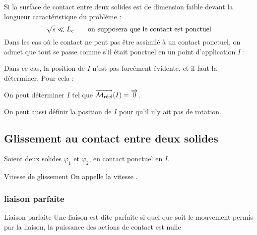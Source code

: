 \documentclass[a4paper,french,bookmarks]{book}
\begin{document}
    Si la surface de contact entre deux solides est de dimension faible devant la longueur caractéristique du problème :
    \[ \sqrt{s} \ll L_\text c \qquad\text{on supposera que le contact est ponctuel}\]
    Dans les cas où le contact ne peut pas être assimilé à un contact ponctuel, on admet que tout se passe comme s'il était ponctuel en un point d'application $I$ :
    \begin{center}
    \end{center}
    Dans ce cas, la position de $I$ n'est pas forcément évidente, et il faut la déterminer. Pour cela :
    \begin{enumerate}
        \itt On peut déterminer $I$ tel que $\overrightarrow{\mathcal{M}_\text{réel}}\!\left(I\right) = \overrightarrow{0}$.
        
        \itt On peut aussi définir la position de $I$ pour qu'il n'y ait pas de rotation.
    \end{enumerate}
    
    \subsection{Glissement au contact entre deux solides}
    
    Soient deux solides $\varphi_1$ et $\varphi_2$, en contact ponctuel en $I$.
    \begin{definition}{Vitesse de glissement}
        On appelle  la vitesse .
    \end{definition}
    

    \subsubsection{liaison parfaite}
    
        \begin{definition}{Liaison parfaite}{}
            Une liaison est dite parfaite si quel que soit le mouvement permis par la liaison, la puissance des actions de contact est nulle
        \end{definition}
    
\end{document}
